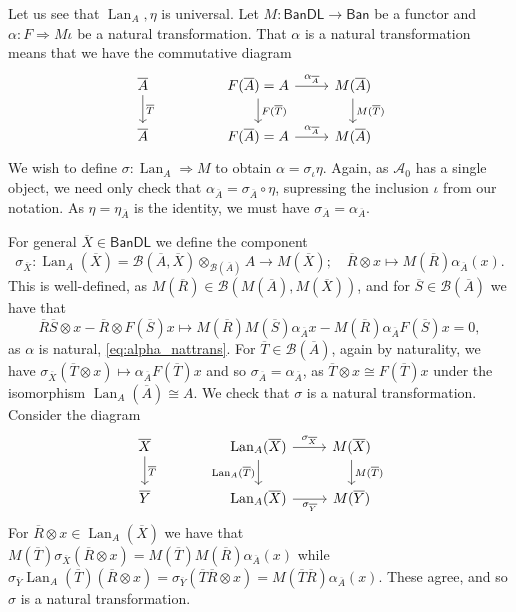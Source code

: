 \documentclass[a4paper,11pt]{article}
\theoremstyle{plain}
\theoremstyle{remark}
\newcommand{\mc}[1]{\mathcal{#1}}
\newcommand{\msf}[1]{\mathsf{#1}}
\newcommand{\lan}{\operatorname{Lan}}
\begin{document}
Let us see that $\lan_A, \eta$ is universal.  Let $M\colon \msf{BanDL} \to \msf{Ban}$ be a functor and $\alpha \colon F \Rightarrow M\iota$ be a natural transformation.
That $\alpha$ is a natural transformation means that we have the commutative diagram
\begin{equation}\label{eq:alpha_nattrans}
\begin{tikzcd}
\overline A \ar[d, "\overline T"] && F(\overline A)=A \ar[d, "F(\overline T)"] \ar[r, "\alpha_{\overline A}"] & M(\overline A)
\ar[d, "M(\overline T)"]
\\
\overline A && F(\overline A)=A \ar[r, "\alpha_{\overline A}"] & M(\overline A)
\end{tikzcd} \end{equation}
We wish to define $\sigma \colon \lan_A \Rightarrow M$ to obtain $\alpha = \sigma_\iota \eta$.  Again, as $\mc A_0$ has a single object, we need only check that $\alpha_{\overline A} = \sigma_{\overline A} \circ \eta$, supressing the inclusion $\iota$ from our notation.  As $\eta = \eta_{\overline A}$ is the identity, we must have $\sigma_{\overline A} = \alpha_{\overline A}$.

For general $\overline X\in\msf{BanDL}$ we define the component
\[ \sigma_{\overline X} \colon \lan_A(\overline X) = \mc B(\overline A, \overline X) \otimes_{\mc B(\overline A)} A \to M(\overline X); \quad
\overline R \otimes x \mapsto M(\overline R) \alpha_{\overline A} (x). \]
This is well-defined, as $M(\overline R) \in \mc B(M(\overline A), M(\overline X))$, and for $\overline S\in\mc B(\overline A)$ we have that
\[ \overline R \overline S \otimes x - \overline R \otimes F(\overline S)x \mapsto M(\overline R) M(\overline S) \alpha_{\overline A}x - M(\overline R) \alpha_{\overline A} F(\overline S)x = 0, \]
as $\alpha$ is natural, \eqref{eq:alpha_nattrans}.  For $\overline T\in\mc B(\overline A)$, again by naturality, we have $\sigma_{\overline X}(\overline T\otimes x) \mapsto \alpha_{\overline A} F(\overline T)x$ and so $\sigma_{\overline A} = \alpha_{\overline A}$, as $\overline T\otimes x \cong F(\overline T)x$ under the isomorphism $\lan_A(\overline A) \cong A$.  We check that $\sigma$ is a natural transformation.  Consider the diagram
\[ \begin{tikzcd}
\overline X \ar[d, "\overline T"] && \lan_A(\overline X) \ar[r, "\sigma_{\overline X}"] \ar[d, "\lan_A(\overline T)"'] & M(\overline X) \ar[d, "M(\overline T)"]
\\
\overline Y && \lan_A(\overline X) \ar[r, "\sigma_{\overline Y}"'] & M(\overline Y)
\end{tikzcd} \]
For $\overline R\otimes x \in \lan_A(\overline X)$ we have that $M(\overline T) \sigma_{\overline X}(\overline R\otimes x) = M(\overline T) M(\overline R) \alpha_{\overline A}(x)$ while $\sigma_{\overline Y} \lan_A(\overline T)(\overline R\otimes x) = \sigma_{\overline Y}(\overline T\overline R\otimes x) = M(\overline T\overline R) \alpha_{\overline A}(x)$.  These agree, and so $\sigma$ is a natural transformation.
\end{document}

